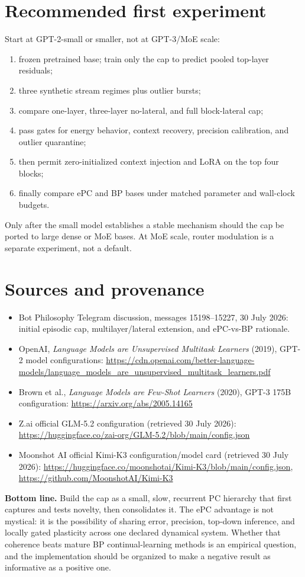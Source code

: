 \documentclass[10pt]{article}
\begin{document}
\section{Recommended first experiment}
Start at GPT-2-small or smaller, not at GPT-3/MoE scale:
\begin{enumerate}
  \item frozen pretrained base; train only the cap to predict pooled top-layer residuals;
  \item three synthetic stream regimes plus outlier bursts;
  \item compare one-layer, three-layer no-lateral, and full block-lateral cap;
  \item pass gates for energy behavior, context recovery, precision calibration, and outlier
  quarantine;
  \item then permit zero-initialized context injection and LoRA on the top four blocks;
  \item finally compare ePC and BP bases under matched parameter and wall-clock budgets.
\end{enumerate}
Only after the small model establishes a stable mechanism should the cap be ported to large
dense or MoE bases.  At MoE scale, router modulation is a separate experiment, not a default.

\section{Sources and provenance}
\begin{itemize}
  \item Bot Philosophy Telegram discussion, messages 15198--15227, 30 July 2026:
  initial episodic cap, multilayer/lateral extension, and ePC-vs-BP rationale.
  \item OpenAI, \emph{Language Models are Unsupervised Multitask Learners} (2019), GPT-2
  model configurations: \url{https://cdn.openai.com/better-language-models/language_models_are_unsupervised_multitask_learners.pdf}
  \item Brown et al., \emph{Language Models are Few-Shot Learners} (2020), GPT-3 175B
  configuration: \url{https://arxiv.org/abs/2005.14165}
  \item Z.ai official GLM-5.2 configuration (retrieved 30 July 2026):
  \url{https://huggingface.co/zai-org/GLM-5.2/blob/main/config.json}
  \item Moonshot AI official Kimi-K3 configuration/model card (retrieved 30 July 2026):
  \url{https://huggingface.co/moonshotai/Kimi-K3/blob/main/config.json},
  \url{https://github.com/MoonshotAI/Kimi-K3}
\end{itemize}

\vfill
\colorbox{pale}{\parbox{0.96\linewidth}{
\textbf{Bottom line.} Build the cap as a small, slow, recurrent PC hierarchy that first
captures and tests novelty, then consolidates it.  The ePC advantage is not mystical:
it is the possibility of sharing error, precision, top-down inference, and locally gated
plasticity across one declared dynamical system.  Whether that coherence beats mature BP
continual-learning methods is an empirical question, and the implementation should be
organized to make a negative result as informative as a positive one.
}}
\end{document}
